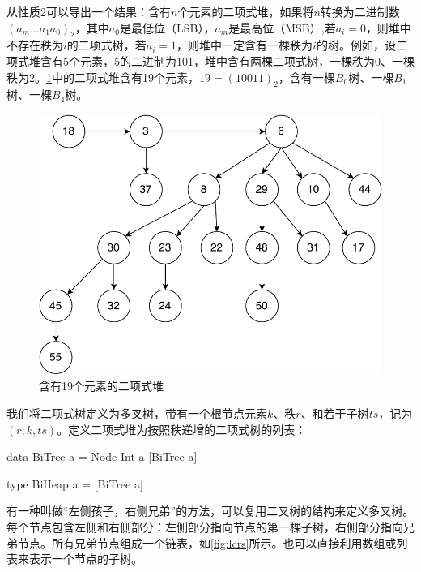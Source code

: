 \documentclass[b5paper]{ctexart}
\begin{document}
从性质2可以导出一个结果：含有$n$个元素的二项式堆，如果将$n$转换为二进制数$(a_m ... a_1 a_0)_2$，其中$a_0$是最低位（LSB），$a_m$是最高位（MSB）,若$a_i=0$，则堆中不存在秩为$i$的二项式树，若$a_i = 1$，则堆中一定含有一棵秩为$i$的树。例如，设二项式堆含有5个元素，5的二进制为101，堆中含有两棵二项式树，一棵秩为0、一棵秩为2。\cref{fig:bheap2}中的二项式堆含有19个元素，$19 = (10011)_2$，含有一棵$B_0$树、一棵$B_1$树、一棵$B_4$树。

\begin{figure}[htbp]
  \centering
  \includegraphics[scale=0.5]{img/binomial-heap}
  \caption{含有19个元素的二项式堆}
  \label{fig:bheap2}
\end{figure}

我们将二项式树定义为多叉树，带有一个根节点元素$k$、秩$r$、和若干子树$ts$，记为$(r, k, ts)$。定义二项式堆为按照秩递增的二项式树的列表：

\lstset{frame=single}
\begin{Haskell}
data BiTree a = Node Int a [BiTree a]

type BiHeap a = [BiTree a]
\end{Haskell}

有一种叫做“左侧孩子，右侧兄弟”\cite{CLRS}的方法，可以复用二叉树的结构来定义多叉树。每个节点包含左侧和右侧部分：左侧部分指向节点的第一棵子树，右侧部分指向兄弟节点。所有兄弟节点组成一个链表，如\cref{fig:lcrs}所示。也可以直接利用数组或列表来表示一个节点的子树。
\end{document}
